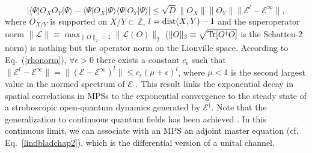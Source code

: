 \documentclass{tADP2e}
\theoremstyle{plain}
\theoremstyle{plain}
\theoremstyle{definition}
\begin{document}
\begin{equation}
|\langle\Psi|O_XO_Y|\Psi\rangle - \langle\Psi|O_X|\Psi\rangle\langle\Psi|O_Y|\Psi\rangle|
\le\sqrt{D} \|O_X\|\|O_Y\|\|\mathcal{E}^l-\mathcal{E}^\infty\|,
\label{MPScor}
\end{equation}
where $O_{X/Y}$ is supported on $X/Y\subset\mathbb{Z}$, $l={\rm dist}(X,Y)-1$ and the superoperator norm $\|\mathcal{L}\|\equiv\max_{\|O\|_2=1}\|\mathcal{L}(O)\|_2$ ($\|O\|_2\equiv\sqrt{{\rm Tr}[O^\dag O]}$ is the Schatten-2 norm) is nothing but the operator norm on the Liouville space. According to Eq.~(\ref{rhonorm}), $\forall \epsilon>0$ there exists a constant $c_\epsilon$ such that $\|\mathcal{E}^l-\mathcal{E}^\infty\|=\|(\mathcal{E}-\mathcal{E}^\infty)^l\|\le c_\epsilon (\mu+\epsilon)^l$, where $\mu<1$ is 
the second largest value in the normed spectrum of $\mathcal{E}$ \cite{MF92}. This result links the exponential decay in spatial correlations in MPSs to the exponential convergence to the steady state of a stroboscopic open-quantum dynamics generated by $\mathcal{E}^\dag$. Note that the generalization to continuous quantum fields has been achieved \cite{VF10}. In this continuous limit, we can associate with an MPS an adjoint master equation (cf. Eq.~\eqref{lindbladchap2}), which is the differential version of a unital channel.  
\end{document}
